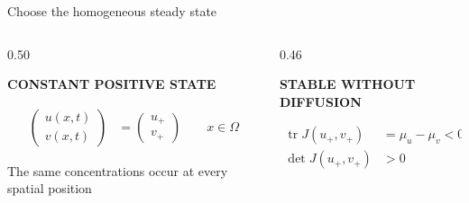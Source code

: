 \begin{frame}{Choose the homogeneous steady state}

  \vspace{-0.18cm}

  \begin{columns}[T,onlytextwidth]

    \begin{column}{0.50\textwidth}

      {\color{HydraGold}\bfseries\fontsize{7.7}{9.2}\selectfont
        CONSTANT POSITIVE STATE\par}

      \vspace{-0.22cm}

      {\color{HydraWhite}\bfseries\fontsize{11.6}{14.7}\selectfont
      \begin{align*}
        \begin{pmatrix}
          u(x,t)
          \\
          v(x,t)
        \end{pmatrix}
        &=
        \begin{pmatrix}
          u_+
          \\
          v_+
        \end{pmatrix}
        \qquad
        x\in\Omega
      \end{align*}
      }

      \vspace{-0.36cm}

      {\color{HydraMuted}\fontsize{7.8}{9.6}\selectfont
        The same concentrations occur at every spatial position
      \par}

    \end{column}

    \begin{column}{0.46\textwidth}

      {\color{HydraCyan}\bfseries\fontsize{7.7}{9.2}\selectfont
        STABLE WITHOUT DIFFUSION\par}

      \vspace{-0.24cm}

      {\color{HydraWhite}\fontsize{9.8}{12.5}\selectfont
      \begin{align*}
        \operatorname{tr}J(u_+,v_+)
        &=
        \mu_u-\mu_v
        <
        0
        \\
        \det J(u_+,v_+)
        &>
        0
      \end{align*}
      }


\end{column}
\end{columns}
\end{frame}
